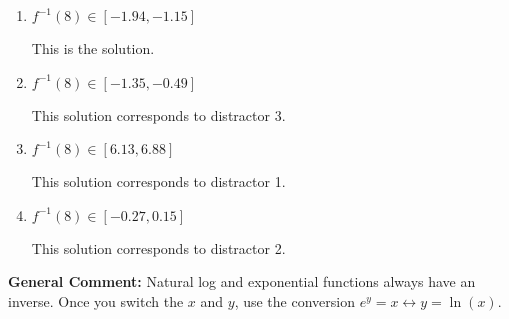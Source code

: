 \documentclass{extbook}[14pt]
\begin{document}
\begin{enumerate}
{\begin{enumerate}[label=\Alph*.]
 This solution corresponds to distractor 4.
\item \( f^{-1}(8) \in [-1.94, -1.15] \)

 This is the solution.
\item \( f^{-1}(8) \in [-1.35, -0.49] \)

 This solution corresponds to distractor 3.
\item \( f^{-1}(8) \in [6.13, 6.88] \)

 This solution corresponds to distractor 1.
\item \( f^{-1}(8) \in [-0.27, 0.15] \)

 This solution corresponds to distractor 2.
\end{enumerate}

\textbf{General Comment:} Natural log and exponential functions always have an inverse. Once you switch the $x$ and $y$, use the conversion $ e^y = x \leftrightarrow y=\ln(x)$.
}
\end{enumerate}
\end{document}
